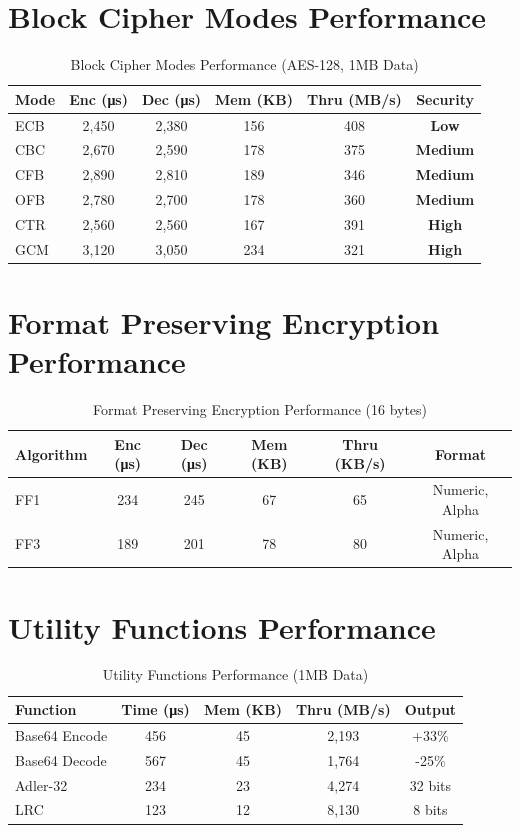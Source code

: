 \documentclass[12pt,a4paper]{article}
\newcommand{\performance}[1]{\textcolor{success}{\textbf{#1}}}
\newcommand{\warning}[1]{\textcolor{warning}{\textbf{#1}}}
\newcommand{\error}[1]{\textcolor{error}{\textbf{#1}}}
\newcommand{\smalltable}[1]{\small #1}
\begin{document}
\section{Block Cipher Modes Performance}

\begin{table}[h]
\centering
\smalltable{
\caption{Block Cipher Modes Performance (AES-128, 1MB Data)}
\begin{tabular}{|l|c|c|c|c|c|}
\hline
\textbf{Mode} & \textbf{Enc (μs)} & \textbf{Dec (μs)} & \textbf{Mem (KB)} & \textbf{Thru (MB/s)} & \textbf{Security} \\
\hline
ECB & 2,450 & 2,380 & 156 & 408 & \error{Low} \\
CBC & 2,670 & 2,590 & 178 & 375 & \warning{Medium} \\
CFB & 2,890 & 2,810 & 189 & 346 & \warning{Medium} \\
OFB & 2,780 & 2,700 & 178 & 360 & \warning{Medium} \\
CTR & 2,560 & 2,560 & 167 & 391 & \performance{High} \\
GCM & 3,120 & 3,050 & 234 & 321 & \performance{High} \\
\hline
\end{tabular}
}
\end{table}

\section{Format Preserving Encryption Performance}

\begin{table}[h]
\centering
\smalltable{
\caption{Format Preserving Encryption Performance (16 bytes)}
\begin{tabular}{|l|c|c|c|c|c|}
\hline
\textbf{Algorithm} & \textbf{Enc (μs)} & \textbf{Dec (μs)} & \textbf{Mem (KB)} & \textbf{Thru (KB/s)} & \textbf{Format} \\
\hline
FF1 & 234 & 245 & 67 & 65 & Numeric, Alpha \\
FF3 & 189 & 201 & 78 & 80 & Numeric, Alpha \\
\hline
\end{tabular}
}
\end{table}

\section{Utility Functions Performance}

\begin{table}[h]
\centering
\smalltable{
\caption{Utility Functions Performance (1MB Data)}
\begin{tabular}{|l|c|c|c|c|}
\hline
\textbf{Function} & \textbf{Time (μs)} & \textbf{Mem (KB)} & \textbf{Thru (MB/s)} & \textbf{Output} \\
\hline
Base64 Encode & 456 & 45 & 2,193 & +33\% \\
Base64 Decode & 567 & 45 & 1,764 & -25\% \\
Adler-32 & 234 & 23 & 4,274 & 32 bits \\
LRC & 123 & 12 & 8,130 & 8 bits \\
\hline
\end{tabular}
}
\end{table}
\end{document}
